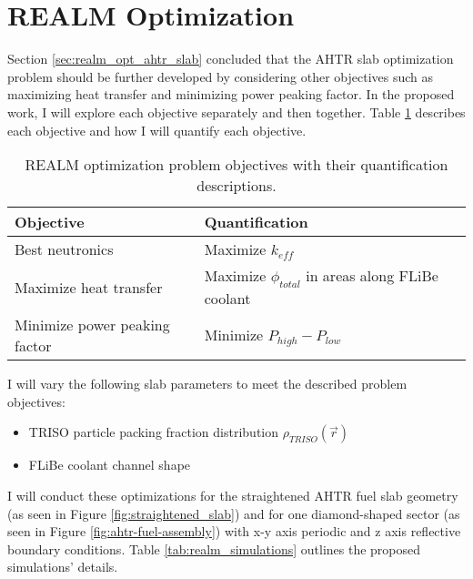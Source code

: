 \section{REALM Optimization}
Section \ref{sec:realm_opt_ahtr_slab} concluded that the \gls{AHTR} slab 
optimization problem should be further developed by considering other objectives 
such as maximizing heat transfer and minimizing power peaking factor. 
In the proposed work, I will explore each objective separately and then together.
Table \ref{tab:objectives} describes each objective and how I will quantify 
each objective. 
\begin{table}[!htbp]
    \centering
    \onehalfspacing
    \caption{\acrfull{REALM} optimization problem objectives with their quantification 
    descriptions.}
	\label{tab:objectives}
    \footnotesize
    \begin{tabular}{p{5cm}p{7cm}}
    \hline 
    \textbf{Objective}& \textbf{Quantification}  \\
    \hline
    Best neutronics & Maximize $k_{eff}$\\ 
    Maximize heat transfer & Maximize $\phi_{total}$ in areas along FLiBe coolant \\
    Minimize power peaking factor & Minimize $P_{high}-P_{low}$ \\
    \hline
    \end{tabular}
\end{table}
I will vary the following slab parameters to meet the described problem objectives: 
\begin{itemize}
    \item \gls{TRISO} particle packing fraction distribution $\rho_{TRISO}(\vec{r})$
    \item \gls{FLiBe} coolant channel shape 
\end{itemize} 
I will conduct these optimizations for the straightened \gls{AHTR} fuel slab 
geometry (as seen in Figure \ref{fig:straightened_slab}) and for one 
diamond-shaped sector (as seen in Figure \ref{fig:ahtr-fuel-assembly}) with 
x-y axis periodic and z axis reflective boundary conditions. 
Table \ref{tab:realm_simulations} outlines the proposed simulations' details. 
